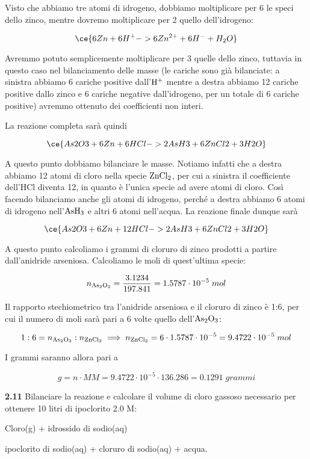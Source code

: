 Visto che abbiamo tre atomi di idrogeno, dobbiamo moltiplicare per 6 le speci dello zinco, mentre dovremo moltiplicare per 2 quello dell'idrogeno:

$$\ce{6Zn + 6H^+ -> 6Zn^{2+} + 6H^- + H_2O}$$

Avremmo potuto semplicemente moltiplicare per 3 quelle dello zinco, tuttavia in questo caso nel bilanciamento delle masse (le cariche sono già bilanciate: a sinistra abbiamo 6 cariche positive dall'$\rm H^+$ mentre a destra abbiamo 12 cariche positive dallo zinco e 6 cariche negative dall'idrogeno, per un totale di 6 cariche positive) avremmo ottenuto dei coefficienti non interi.

La reazione completa sarà quindi 

$$\ce{As2O3 + 6Zn + 6HCl -> 2AsH3 + 6ZnCl2 + 3H2O}$$

A questo punto dobbiamo bilanciare le masse. Notiamo infatti che a destra abbiamo 12 atomi di cloro nella specie $\rm ZnCl_2$, per cui a sinistra il coefficiente dell'HCl diventa 12, in quanto è l'unica specie ad avere atomi di cloro. Così facendo bilanciamo anche gli atomi di idrogeno, perché a destra abbiamo 6 atomi di idrogeno nell'$\rm AsH_3$ e altri 6 atomi nell'acqua. La reazione finale dunque sarà

$$\ce{As2O3 + 6Zn + 12HCl -> 2AsH3 + 6ZnCl2 + 3H2O}$$

A questo punto calcoliamo i grammi di cloruro di zinco prodotti a partire dall'anidride arseniosa. Calcoliamo le moli di quest'ultima specie:

$$n_{\rm As_2O_3}=\frac{3.1234}{197.841}
=1.5787 \cdot 10^{-5}\;mol$$

Il rapporto stechiometrico tra l'anidride arseniosa e il cloruro di zinco è 1:6, per cui il numero di moli sarà pari a 6 volte quello dell'$\rm As_2O_3$:

$$1:6=n_{\rm As_2O_3}:n_{\rm ZnCl_2}
\implies
n_{\rm ZnCl_2}=6 \cdot 1.5787 \cdot 10^{-5}
=9.4722 \cdot 10^{-5}\;mol$$

I grammi saranno allora pari a 

$$g=n \cdot MM
=9.4722 \cdot 10^{-5} \cdot 136.286
=0.1291\;grammi$$

\vspace{0.2cm}\textbf{2.11} Bilanciare la reazione e calcolare il volume di cloro gassoso necessario per ottenere 10 litri di ipoclorito 2.0 M:

\begin{center}
    Cloro(g) + idrossido di sodio(aq) \ce{->} 
    
    \ce{->} ipoclorito di sodio(aq) + cloruro di sodio(aq) + acqua. 
\end{center}

